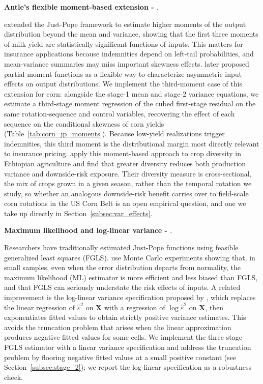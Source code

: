 \documentclass[12pt,letterpaper]{article}
\theoremstyle{remark}
\theoremstyle{remark}
\theoremstyle{plain}
\theoremstyle{definition}
\begin{document}
\medskip\noindent\textbf{Antle's flexible moment-based extension - \cite{antle1983, Antle2010}}.

\cite{antle1983} extended the Just-Pope framework to estimate higher moments of the output distribution beyond the mean and variance, showing that the first three moments of milk yield are statistically significant functions of inputs. This matters for
insurance applications because indemnities depend on left-tail probabilities, and mean-variance summaries may miss important skewness effects. \cite{Antle2010} later proposed partial-moment functions as a flexible way to characterize asymmetric input effects on output distributions. We implement the third-moment case of this extension for corn: alongside the stage-1 mean and stage-2 variance equations, we estimate a third-stage moment regression of the cubed first-stage residual on the same rotation-sequence and control variables, recovering the effect of each sequence on the conditional skewness of corn yields (Table~\ref{tab:corn_jp_moments}). Because low-yield realizations trigger indemnities, this third moment is the distributional margin most directly relevant to insurance pricing. \citet{difalco2009} apply this moment-based approach to crop diversity in Ethiopian agriculture and find that greater diversity reduces both production variance and downside-risk exposure. Their diversity measure is cross-sectional, the mix of crops grown in a given season, rather than the temporal rotation we study, so whether an analogous downside-risk benefit carries over to field-scale corn rotations in the US Corn Belt is an open empirical question, and one we take up directly in Section~\ref{subsec:var_effects}.

\medskip\noindent\textbf{Maximum likelihood and log-linear variance - \cite{Harvey1976, Saha1997}}.

Researchers have traditionally estimated Just-Pope functions using feasible generalized least squares (FGLS). \cite{Saha1997} use Monte Carlo experiments showing that, in small samples, even when the error distribution departs from normality, the maximum likelihood (ML) estimator is more efficient and less biased than FGLS, and that FGLS can seriously understate the risk effects of inputs. A related improvement is the log-linear variance specification proposed by \cite{Harvey1976}, which replaces the linear regression of $\hat{\varepsilon}^2$ on $\mathbf{X}$ with a regression of $\log \hat{\varepsilon}^2$ on $\mathbf{X}$, then exponentiates fitted values to obtain strictly positive variance estimates. This avoids the truncation problem that arises when the linear approximation produces negative fitted values for some cells. We implement the three-stage FGLS estimator with a linear variance specification and
address the truncation problem by flooring negative fitted values at a small positive constant (see Section~\ref{subsec:stage_2}); we report the log-linear specification as a robustness check.
\end{document}
